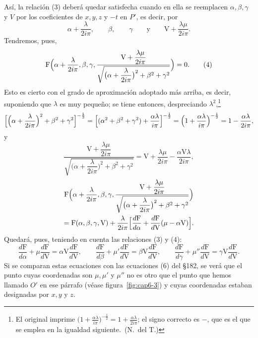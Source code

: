 Así, la relación (3) deberá quedar satisfecha cuando en ella se reemplacen
$\alpha,\beta,\gamma$ y $V$ por los coeficientes de $x,y,z$ y $-t$ en
$P'$, es decir, por
\[
\alpha+\frac{\lambda}{2i\pi},\qquad \beta,\qquad \gamma\qquad\text{y}\qquad
\mathrm V+\frac{\lambda\mu}{2i\pi}.
\]
Tendremos, pues,
\begin{equation}
\mathrm F\Bigl(\alpha+\frac{\lambda}{2i\pi},\beta,\gamma,
\frac{\mathrm V+\dfrac{\lambda\mu}{2i\pi}}{\sqrt{\bigl(\alpha+\dfrac{\lambda}{2i\pi}\bigr)^2+\beta^2+\gamma^2}}\Bigr)=0.
\tag{4}
\end{equation}
Esto es cierto con el grado de aproximación adoptado más arriba, es
decir, suponiendo que $\lambda$ es muy pequeño; se tiene entonces,
despreciando $\lambda^2$,\footnote{El original imprime
$\bigl(1+\frac{\alpha\lambda}{i\pi}\bigr)^{-\frac12}=1+\frac{\alpha\lambda}{2i\pi}$;
el signo correcto es $-$, que es el que se emplea en la igualdad
siguiente.~(N.~del T.)}
\[
\Bigl[\Bigl(\alpha+\frac{\lambda}{2i\pi}\Bigr)^2+\beta^2+\gamma^2\Bigr]^{-\frac12}
=\Bigl[(\alpha^2+\beta^2+\gamma^2)+\frac{\alpha\lambda}{i\pi}\Bigr]^{-\frac12}
=\Bigl(1+\frac{\alpha\lambda}{i\pi}\Bigr)^{-\frac12}=1-\frac{\alpha\lambda}{2i\pi},
\]
y
\[
\frac{\mathrm V+\dfrac{\lambda\mu}{2i\pi}}{\sqrt{\bigl(\alpha+\dfrac{\lambda}{2i\pi}\bigr)^2+\beta^2+\gamma^2}}
=\mathrm V+\frac{\lambda\mu}{2i\pi}-\frac{\alpha\mathrm V\lambda}{2i\pi},
\]
\begin{multline*}
\mathrm F\Bigl(\alpha+\frac{\lambda}{2i\pi},\beta,\gamma,
\frac{\mathrm V+\dfrac{\lambda\mu}{2i\pi}}{\sqrt{\bigl(\alpha+\dfrac{\lambda}{2i\pi}\bigr)^2+\beta^2+\gamma^2}}\Bigr)\\
=\mathrm F(\alpha,\beta,\gamma,\mathrm V)+\frac{\lambda}{2i\pi}\Bigl[\frac{d\mathrm F}{d\alpha}+\frac{d\mathrm F}{d\mathrm V}(\mu-\alpha\mathrm V)\Bigr].
\end{multline*}
Quedará, pues, teniendo en cuenta las relaciones (3) y (4):
\[
\frac{d\mathrm F}{d\alpha}+\mu\frac{d\mathrm F}{d\mathrm V}=\alpha\mathrm V\frac{d\mathrm F}{d\mathrm V},\qquad
\frac{d\mathrm F}{d\beta}+\mu'\frac{d\mathrm F}{d\mathrm V}=\beta\mathrm V\frac{d\mathrm F}{d\mathrm V},\qquad
\frac{d\mathrm F}{d\gamma}+\mu''\frac{d\mathrm F}{d\mathrm V}=\gamma\mathrm V\frac{d\mathrm F}{d\mathrm V}.
\]
Si se comparan estas ecuaciones con las ecuaciones (6) del §182, se verá
que el punto cuyas coordenadas son $\mu,\mu'$ y $\mu''$ no es otro que el
punto que hemos llamado $O'$ en ese párrafo (véase figura~\ref{fig:cap6-3})
y cuyas coordenadas estaban designadas por $x,y$ y $z$.

